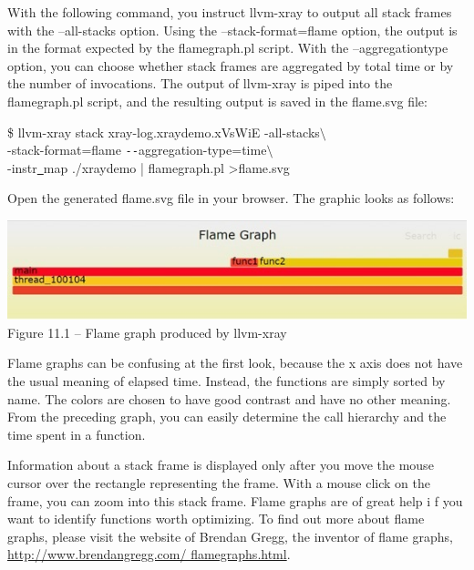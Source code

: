 With the following command, you instruct llvm-xray to output all stack frames with the –all-stacks option. Using the –stack-format=flame option, the output is in the format expected by the flamegraph.pl script. With the –aggregationtype option, you can choose whether stack frames are aggregated by total time or by the number of invocations. The output of llvm-xray is piped into the flamegraph.pl script, and the resulting output is saved in the flame.svg file:\par

\begin{tcolorbox}[colback=white,colframe=black]
\$ llvm-xray stack xray-log.xraydemo.xVsWiE -all-stacks$\setminus$ \\
\hspace*{0.5cm}-stack-format=flame \verb|--|aggregation-type=time$\setminus$ \\
\hspace*{0.5cm}-instr\underline{~}map ./xraydemo | flamegraph.pl >flame.svg
\end{tcolorbox}

Open the generated flame.svg file in your browser. The graphic looks as follows:\par

\hspace*{\fill} \par %
\begin{center}
\includegraphics[width=1\textwidth]{content/3/chapter11/images/1.jpg}\\
Figure 11.1 – Flame graph produced by llvm-xray
\end{center}

Flame graphs can be confusing at the first look, because the x axis does not have the usual meaning of elapsed time. Instead, the functions are simply sorted by name. The colors are chosen to have good contrast and have no other meaning. From the preceding graph, you can easily determine the call hierarchy and the time spent in a function.\par

Information about a stack frame is displayed only after you move the mouse cursor over the rectangle representing the frame. With a mouse click on the frame, you can zoom into this stack frame. Flame graphs are of great help i f you want to identify functions worth optimizing. To find out more about flame graphs, please visit the website of Brendan Gregg, the inventor of flame graphs, \url{http://www.brendangregg.com/
flamegraphs.html}.\par

